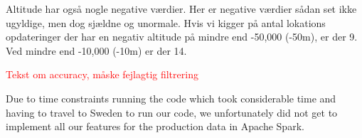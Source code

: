 Altitude har også nogle negative værdier. Her er negative værdier sådan set ikke ugyldige, men dog sjældne og unormale. Hvis vi kigger på antal lokations opdateringer der har en negativ altitude på mindre end -50,000 (-50m), er der 9. Ved mindre end -10,000 (-10m) er der 14.



\textcolor{red}{Tekst om accuracy, måske fejlagtig filtrering}

Due to time constraints running the code which took considerable time and having to travel to Sweden to run our code, we unfortunately did not get to implement all our features for the production data in Apache Spark.